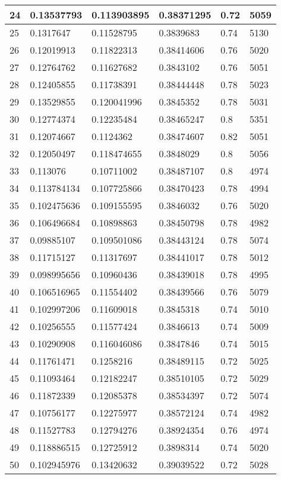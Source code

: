 \begin{longtable}{|l|l|l|l|l|l|}
24 & 0.13537793 & 0.113903895 & 0.38371295 & 0.72 & 5059 \\ \hline 
25 & 0.1317647 & 0.11528795 & 0.3839683 & 0.74 & 5130 \\ \hline 
26 & 0.12019913 & 0.11822313 & 0.38414606 & 0.76 & 5020 \\ \hline 
27 & 0.12764762 & 0.11627682 & 0.3843102 & 0.76 & 5051 \\ \hline 
28 & 0.12405855 & 0.11738391 & 0.38444448 & 0.78 & 5023 \\ \hline 
29 & 0.13529855 & 0.120041996 & 0.3845352 & 0.78 & 5031 \\ \hline 
30 & 0.12774374 & 0.12235484 & 0.38465247 & 0.8 & 5351 \\ \hline 
31 & 0.12074667 & 0.1124362 & 0.38474607 & 0.82 & 5051 \\ \hline 
32 & 0.12050497 & 0.118474655 & 0.3848029 & 0.8 & 5056 \\ \hline 
33 & 0.113076 & 0.10711002 & 0.38487107 & 0.8 & 4974 \\ \hline 
34 & 0.113784134 & 0.107725866 & 0.38470423 & 0.78 & 4994 \\ \hline 
35 & 0.102475636 & 0.109155595 & 0.3846032 & 0.76 & 5020 \\ \hline 
36 & 0.106496684 & 0.10898863 & 0.38450798 & 0.78 & 4982 \\ \hline 
37 & 0.09885107 & 0.109501086 & 0.38443124 & 0.78 & 5074 \\ \hline 
38 & 0.11715127 & 0.11317697 & 0.38441017 & 0.78 & 5012 \\ \hline 
39 & 0.098995656 & 0.10960436 & 0.38439018 & 0.78 & 4995 \\ \hline 
40 & 0.106516965 & 0.11554402 & 0.38439566 & 0.76 & 5079 \\ \hline 
41 & 0.102997206 & 0.11609018 & 0.3845318 & 0.74 & 5010 \\ \hline 
42 & 0.10256555 & 0.11577424 & 0.3846613 & 0.74 & 5009 \\ \hline 
43 & 0.10290908 & 0.116046086 & 0.3847846 & 0.74 & 5015 \\ \hline 
44 & 0.11761471 & 0.1258216 & 0.38489115 & 0.72 & 5025 \\ \hline 
45 & 0.11093464 & 0.12182247 & 0.38510105 & 0.72 & 5029 \\ \hline 
46 & 0.11872339 & 0.12085378 & 0.38534397 & 0.72 & 5074 \\ \hline 
47 & 0.10756177 & 0.12275977 & 0.38572124 & 0.74 & 4982 \\ \hline 
48 & 0.11527783 & 0.12794276 & 0.38924354 & 0.76 & 4974 \\ \hline 
49 & 0.118886515 & 0.12725912 & 0.3898314 & 0.74 & 5020 \\ \hline 
50 & 0.102945976 & 0.13420632 & 0.39039522 & 0.72 & 5028 \\ \hline 
\end{longtable}